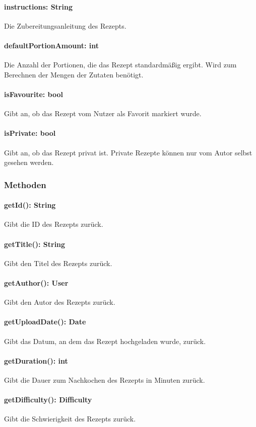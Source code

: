 \documentclass[parskip=full]{scrartcl}
\begin{document}
\paragraph{instructions: String}
Die Zubereitungsanleitung des Rezepts.
\paragraph{defaultPortionAmount: int}
Die Anzahl der Portionen, die das Rezept standardmäßig ergibt. Wird zum Berechnen der Mengen der Zutaten benötigt.
\paragraph{isFavourite: bool}
Gibt an, ob das Rezept vom Nutzer als Favorit markiert wurde.
\paragraph{isPrivate: bool}
Gibt an, ob das Rezept privat ist. Private Rezepte können nur vom Autor selbst gesehen werden.

\subsubsection*{Methoden}
\paragraph{getId(): String}
Gibt die ID des Rezepts zurück.
\paragraph{getTitle(): String}
Gibt den Titel des Rezepts zurück.
\paragraph{getAuthor(): User}
Gibt den Autor des Rezepts zurück.
\paragraph{getUploadDate(): Date}
Gibt das Datum, an dem das Rezept hochgeladen wurde, zurück.
\paragraph{getDuration(): int}
Gibt die Dauer zum Nachkochen des Rezepts in Minuten zurück.
\paragraph{getDifficulty(): Difficulty}
Gibt die Schwierigkeit des Rezepts zurück.
\end{document}
